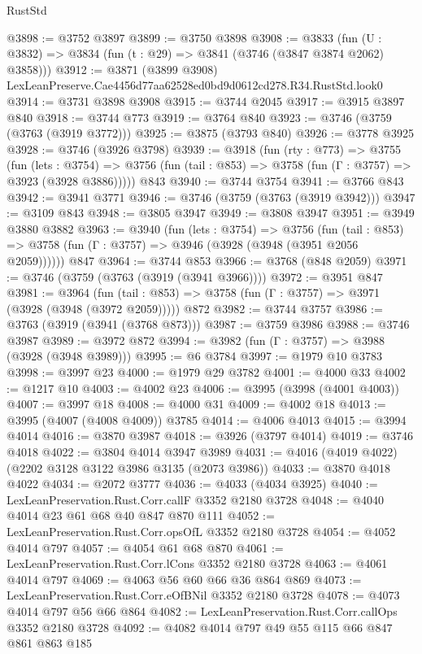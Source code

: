 \begin{lexlean}{RustStd}
\begin{coremodule}
@3898 := @3752 @3897
@3899 := @3750 @3898
@3908 := @3833 (fun (U : @3832) => @3834 (fun (t : @29) => @3841 (@3746 (@3847 @3874 @2062) @3858)))
@3912 := @3871 (@3899 @3908) LexLeanPreserve.Cae4456d77aa62528ed0bd9d0612cd278.R34.RustStd.look0
@3914 := @3731 @3898 @3908
@3915 := @3744 @2045
@3917 := @3915 @3897 @840
@3918 := @3744 @773
@3919 := @3764 @840
@3923 := @3746 (@3759 (@3763 (@3919 @3772)))
@3925 := @3875 (@3793 @840)
@3926 := @3778 @3925
@3928 := @3746 (@3926 @3798)
@3939 := @3918
    (fun (rty : @773) =>
    @3755
      (fun (lets : @3754) =>
      @3756 (fun (tail : @853) => @3758 (fun (Γ : @3757) => @3923 (@3928 @3886)))))
    @843
@3940 := @3744 @3754
@3941 := @3766 @843
@3942 := @3941 @3771
@3946 := @3746 (@3759 (@3763 (@3919 @3942)))
@3947 := @3109 @843
@3948 := @3805 @3947
@3949 := @3808 @3947
@3951 := @3949 @3880 @3882
@3963 := @3940
    (fun (lets : @3754) =>
    @3756
      (fun (tail : @853) => @3758 (fun (Γ : @3757) => @3946 (@3928 (@3948 (@3951 @2056 @2059))))))
    @847
@3964 := @3744 @853
@3966 := @3768 (@848 @2059)
@3971 := @3746 (@3759 (@3763 (@3919 (@3941 @3966))))
@3972 := @3951 @847
@3981 := @3964
    (fun (tail : @853) => @3758 (fun (Γ : @3757) => @3971 (@3928 (@3948 (@3972 @2059)))))
    @872
@3982 := @3744 @3757
@3986 := @3763 (@3919 (@3941 (@3768 @873)))
@3987 := @3759 @3986
@3988 := @3746 @3987
@3989 := @3972 @872
@3994 := @3982 (fun (Γ : @3757) => @3988 (@3928 (@3948 @3989)))
@3995 := @6 @3784
@3997 := @1979 @10 @3783
@3998 := @3997 @23
@4000 := @1979 @29 @3782
@4001 := @4000 @33
@4002 := @1217 @10
@4003 := @4002 @23
@4006 := @3995 (@3998 (@4001 @4003))
@4007 := @3997 @18
@4008 := @4000 @31
@4009 := @4002 @18
@4013 := @3995 (@4007 (@4008 @4009)) @3785
@4014 := @4006 @4013
@4015 := @3994 @4014
@4016 := @3870 @3987
@4018 := @3926 (@3797 @4014)
@4019 := @3746 @4018
@4022 := @3804 @4014 @3947 @3989
@4031 := @4016 (@4019 @4022) (@2202 @3128 @3122 @3986 @3135 (@2073 @3986))
@4033 := @3870 @4018 @4022
@4034 := @2072 @3777
@4036 := @4033 (@4034 @3925)
@4040 := LexLeanPreservation.Rust.Corr.callF @3352 @2180 @3728
@4048 := @4040 @4014 @23 @61 @68 @40 @847 @870 @111
@4052 := LexLeanPreservation.Rust.Corr.opsOfL @3352 @2180 @3728
@4054 := @4052 @4014 @797
@4057 := @4054 @61 @68 @870
@4061 := LexLeanPreservation.Rust.Corr.lCons @3352 @2180 @3728
@4063 := @4061 @4014 @797
@4069 := @4063 @56 @60 @66 @36 @864 @869
@4073 := LexLeanPreservation.Rust.Corr.eOfBNil @3352 @2180 @3728
@4078 := @4073 @4014 @797 @56 @66 @864
@4082 := LexLeanPreservation.Rust.Corr.callOps @3352 @2180 @3728
@4092 := @4082 @4014 @797 @49 @55 @115 @66 @847 @861 @863 @185

\end{coremodule}
\end{lexlean}
